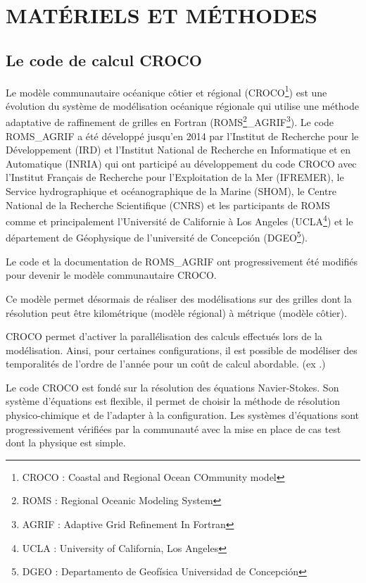 \documentclass[10pt,a4paper,titlepage]{article}
\begin{document}
\newpage

\section{MATÉRIELS ET MÉTHODES}
\label{sec:materiel_methodes}
\subsection{Le code de calcul CROCO}
\label{sub:croco}
Le modèle communautaire océanique côtier et régional (CROCO\footnote{CROCO : Coastal and Regional Ocean COmmunity model}) est une évolution du système de modélisation océanique régionale qui utilise une méthode adaptative de raffinement de grilles en Fortran (ROMS\footnote{ROMS : Regional Oceanic Modeling System}\_AGRIF\footnote{AGRIF : Adaptive Grid Refinement In Fortran}).
Le code ROMS\_AGRIF a été développé jusqu'en 2014 par l'Institut de Recherche pour le Développement (IRD) et l'Institut National de Recherche en Informatique et en Automatique (INRIA) qui ont participé au développement du code CROCO avec
l'Institut Français de Recherche pour l'Exploitation de la Mer (IFREMER), 
le Service hydrographique et océanographique de la Marine (SHOM), 
le Centre National de la Recherche Scientifique (CNRS)
et les participants de ROMS comme et principalement 
l'Université de Californie à Los Angeles (UCLA\footnote{UCLA : University of California, Los Angeles}) 
et le département de Géophysique de l'université de Concepción (DGEO\footnote{DGEO : Departamento de Geofísica Universidad de Concepción}).

Le code et la documentation de ROMS\_AGRIF ont progressivement été modifiés pour devenir le modèle communautaire CROCO.

Ce modèle permet désormais de réaliser des modélisations sur des grilles dont la résolution peut être kilométrique (modèle régional) à métrique (modèle côtier).

CROCO permet d'activer la parallélisation des calculs effectués lors de la modélisation. Ainsi, pour certaines configurations, il est possible de modéliser des temporalités de l'ordre de l'année pour un coût de calcul abordable. (ex .)

Le code CROCO est fondé sur la résolution des équations Navier-Stokes.
Son système d'équations est flexible, il permet de choisir la méthode de résolution physico-chimique et de l'adapter à la configuration.
Les systèmes d'équations sont progressivement vérifiées par la communauté avec la mise en place de cas test dont la physique est simple. %
\end{document}
